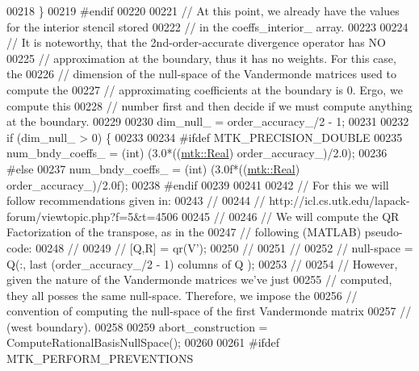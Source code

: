 \begin{DoxyCode}
00218   \}
00219 \textcolor{preprocessor}{  #endif}
00220 
00221   \textcolor{comment}{// At this point, we already have the values for the interior stencil stored}
00222   \textcolor{comment}{// in the coeffs\_interior\_ array.}
00223 
00224   \textcolor{comment}{// It is noteworthy, that the 2nd-order-accurate divergence operator has NO}
00225   \textcolor{comment}{// approximation at the boundary, thus it has no weights. For this case, the}
00226   \textcolor{comment}{// dimension of the null-space of the Vandermonde matrices used to compute the}
00227   \textcolor{comment}{// approximating coefficients at the boundary is 0. Ergo, we compute this}
00228   \textcolor{comment}{// number first and then decide if we must compute anything at the boundary.}
00229 
00230   dim\_null\_ = order\_accuracy\_/2 - 1;
00231 
00232   \textcolor{keywordflow}{if} (dim\_null\_ > 0) \{
00233 
00234 \textcolor{preprocessor}{    #ifdef MTK\_PRECISION\_DOUBLE}
00235     num\_bndy\_coeffs\_ = (int) (3.0*((\hyperlink{group__c01-roots_gac080bbbf5cbb5502c9f00405f894857d}{mtk::Real}) order\_accuracy\_)/2.0);
00236 \textcolor{preprocessor}{    #else}
00237     num\_bndy\_coeffs\_ = (int) (3.0f*((\hyperlink{group__c01-roots_gac080bbbf5cbb5502c9f00405f894857d}{mtk::Real}) order\_accuracy\_)/2.0f);
00238 \textcolor{preprocessor}{    #endif}
00239 
00241 
00242     \textcolor{comment}{// For this we will follow recommendations given in:}
00243     \textcolor{comment}{//}
00244     \textcolor{comment}{// http://icl.cs.utk.edu/lapack-forum/viewtopic.php?f=5&t=4506}
00245     \textcolor{comment}{//}
00246     \textcolor{comment}{// We will compute the QR Factorization of the transpose, as in the}
00247     \textcolor{comment}{// following (MATLAB) pseudo-code:}
00248     \textcolor{comment}{//}
00249     \textcolor{comment}{// [Q,R] = qr(V'); %
00250     \textcolor{comment}{// %
00251     \textcolor{comment}{//}
00252     \textcolor{comment}{// null-space = Q(:, last (order\_accuracy\_/2 - 1) columns of Q );}
00253     \textcolor{comment}{//}
00254     \textcolor{comment}{// However, given the nature of the Vandermonde matrices we've just}
00255     \textcolor{comment}{// computed, they all posses the same null-space. Therefore, we impose the}
00256     \textcolor{comment}{// convention of computing the null-space of the first Vandermonde matrix}
00257     \textcolor{comment}{// (west boundary).}
00258 
00259     abort\_construction = ComputeRationalBasisNullSpace();
00260 
00261 \textcolor{preprocessor}{    #ifdef MTK\_PERFORM\_PREVENTIONS}
}}
\end{DoxyCode}
